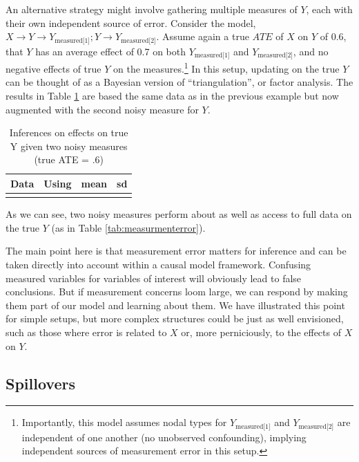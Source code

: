 \documentclass[
  12pt,
]{book}
\begin{document}
An alternative strategy might involve gathering multiple measures of \(Y\), each with their own independent source of error. Consider the model, \(X \rightarrow Y \rightarrow Y_\text{measured[1]}; Y \rightarrow Y_\text{measured[2]}\). Assume again a true \(ATE\) of \(X\) on \(Y\) of 0.6, that \(Y\) has an average effect of 0.7 on both \(Y_\text{measured[1]}\) and \(Y_\text{measured[2]}\), and no negative effects of true \(Y\) on the measures.\footnote{Importantly, this model assumes nodal types for \(Y_\text{measured[1]}\) and \(Y_\text{measured[2]}\) are independent of one another (no unobserved confounding), implying independent sources of measurement error in this setup.} In this setup, updating on the true \(Y\) can be thought of as a Bayesian version of ``triangulation'', or factor analysis. The results in Table \ref{tab:measurementerror2} are based the same data as in the previous example but now augmented with the second noisy measure for \(Y\).

\begin{table}

\caption{\label{tab:measurementerror2}Inferences on effects on true Y given two noisy measures  (true ATE = .6)}
\centering
\begin{tabular}[t]{llrr}
\toprule
Data & Using & mean & sd\\
\midrule
\cellcolor{gray!6}{Two noisy measures} & \cellcolor{gray!6}{posteriors} & \cellcolor{gray!6}{0.61} & \cellcolor{gray!6}{0.02}\\
\bottomrule
\end{tabular}
\end{table}

As we can see, two noisy measures perform about as well as access to full data on the true \(Y\) (as in Table \ref{tab:measurmenterror}).

The main point here is that measurement error matters for inference and can be taken directly into account within a causal model framework. Confusing measured variables for variables of interest will obviously lead to false conclusions. But if measurement concerns loom large, we can respond by making them part of our model and learning about them. We have illustrated this point for simple setups, but more complex structures could be just as well envisioned, such as those where error is related to \(X\) or, more perniciously, to the effects of \(X\) on \(Y\).

\hypertarget{spillovers}{%
\subsection{Spillovers}\label{spillovers}}
\end{document}
